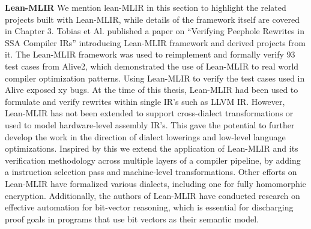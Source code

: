 \textbf{Lean-MLIR}
We mention lean-MLIR in this section to highlight the related projects built with Lean-MLIR, while details of the framework itself are covered in Chapter 3. Tobias et Al. published a paper on “Verifying Peephole Rewrites in SSA Compiler IRs” introducing Lean-MLIR framework and derived projects from it. The Lean-MLIR framework was used to reimplement and formally verify 93 test cases from Alive2, which demonstrated the use of Lean-MLIR to real world compiler optimization patterns. Using Lean-MLIR to verify the test cases used in Alive exposed xy bugs.  At the time of this thesis, Lean-MLIR had been used to formulate and verify rewrites within single IR's such as LLVM IR. However, Lean-MLIR has not been extended to support cross-dialect transformations or used to model hardware-level assembly IR's. This gave the potential to further develop the work in the direction of dialect lowerings and low-level language optimizations. Inspired by this we extend the application of Lean-MLIR and its verification methodology across multiple layers of a compiler pipeline, by adding a instruction selection pass and machine-level transformations. Other efforts on Lean-MLIR have formalized various dialects, including one for fully homomorphic encryption. Additionally, the authors of Lean-MLIR have conducted research on effective automation for bit-vector reasoning, which is essential for discharging proof goals in programs that use bit vectors as their semantic model.

